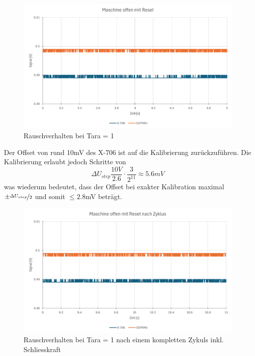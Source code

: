 \documentclass[12pt,a4paper]{article}
\begin{document}
\begin{figure}[H]
	\centering
	\includegraphics[width=1\linewidth]{imgs/rauschen_mit_tara1}
	\caption{Rauschverhalten bei Tara = 1}
	\label{fig:rauschenmittara1}
\end{figure}\noindent
Der Offset von rund 10mV des X-706 ist auf die Kalibrierung zurückzuführen. Die Kalibrierung erlaubt jedoch Schritte von 
\begin{equation*}
	\Delta U_{step}\frac{10V}{2.6}\cdot \frac{3}{2^{11}} \approx 5.6mV
\end{equation*}
was wiederum bedeutet, dass der Offset bei exakter Kalibration maximal $\pm\nicefrac{\Delta U_{step}}{2}$ und somit $\leq 2.8$mV beträgt.

\begin{figure}[H]
	\centering
	\includegraphics[width=1\linewidth]{imgs/rauschen_mit_tara2}
	\caption{Rauschverhalten bei Tara = 1 nach einem kompletten Zykuls inkl. Schliesskraft}
	\label{fig:rauschenmittara2}
\end{figure}
\end{document}

